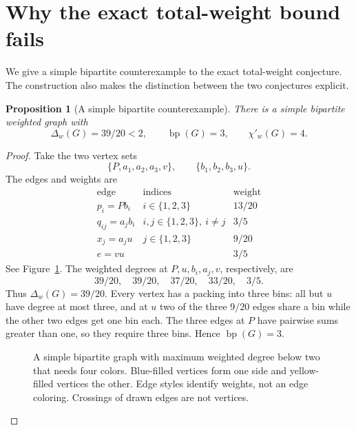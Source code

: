 \documentclass[11pt]{article}
\newtheorem{proposition}[theorem]{Proposition}
\theoremstyle{definition}\newtheorem{algorithm}{Algorithm}[section]
\numberwithin{equation}{section}
\theoremstyle{remark}\newtheorem*{remark}{Remark}
\newcommand{\bp}{\operatorname{bp}}
\begin{document}
\section{Why the exact total-weight bound fails}\label{sec:counterexample}
We give a simple bipartite counterexample to the exact total-weight
conjecture. The construction also makes the distinction between the
two conjectures explicit.

\begin{proposition}[A simple bipartite counterexample]\label{prop:counterexample}
There is a simple bipartite weighted graph with
\[
 \Delta_w(G)=39/20<2,\qquad \bp(G)=3,\qquad \chi'_w(G)=4.
\]
\end{proposition}
\begin{proof}
Take the two vertex sets
\[
 \{P,a_1,a_2,a_3,v\},\qquad \{b_1,b_2,b_3,u\}.
\]
The edges and weights are
\[
 \begin{array}{c|c|c}
 \text{edge}&\text{indices}&\text{weight}\\ \hline
 p_i=Pb_i&i\in\{1,2,3\}&13/20\\
 q_{ij}=a_jb_i&i,j\in\{1,2,3\},\ i\ne j&3/5\\
 x_j=a_ju&j\in\{1,2,3\}&9/20\\
 e=vu&&3/5
 \end{array}
\]
See Figure~\ref{fig:counterexample}. The weighted degrees at
$P,u,b_i,a_j,v$, respectively, are
\[
 39/20,\quad39/20,\quad37/20,\quad33/20,\quad3/5.
\]
Thus $\Delta_w(G)=39/20$. Every vertex has a packing into three bins:
all but $u$ have degree at most three, and at $u$ two of the three
$9/20$ edges share a bin while the other two edges get one bin each.
The three edges at $P$ have pairwise sums greater than one, so they
require three bins. Hence $\bp(G)=3$.

\begin{figure}[htbp]
\centering
{}
\caption{A simple bipartite graph with maximum weighted degree below
two that needs four colors. Blue-filled vertices form one side and
yellow-filled vertices the other. Edge styles identify weights, not
an edge coloring. Crossings of drawn edges are not vertices.}
\label{fig:counterexample}
\end{figure}


\end{proof}
\end{document}
